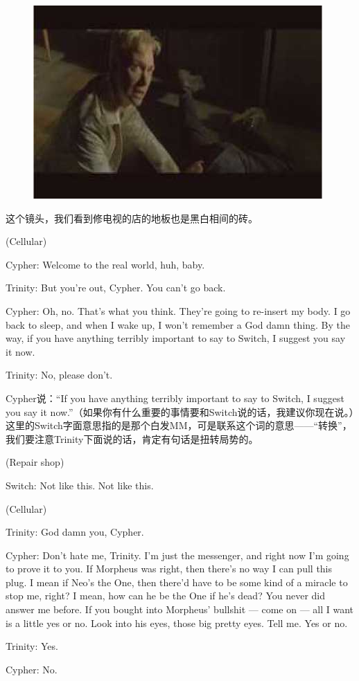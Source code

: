 \documentclass{ctexart}
\newenvironment{myquote}{\color{green} \setlength{\leftskip}{6em} \setlength{\rightskip}{4em} \setlength{\parindent}{-2em}}{\par}
\begin{document}
\begin{figure}[htb]
\centering
\includegraphics[width=0.5\linewidth]{fig/read_Matrix-59}
\end{figure}

这个镜头，我们看到修电视的店的地板也是黑白相间的砖。

\begin{myquote}
(Cellular)

Cypher: Welcome to the real world, huh, baby.

Trinity: But you're out, Cypher. You can't go back.

Cypher: Oh, no. That's what you think. They're going to re-insert my body. I go back to sleep, and when I wake up, I won't remember a God damn thing. By the way, if you have anything terribly important to say to Switch, I suggest you say it now.

Trinity: No, please don't.
\end{myquote}

Cypher说：“If you have anything terribly important to say to Switch, I suggest you say it now.”（如果你有什么重要的事情要和Switch说的话，我建议你现在说。）这里的Switch字面意思指的是那个白发MM，可是联系这个词的意思——“转换”，我们要注意Trinity下面说的话，肯定有句话是扭转局势的。

\begin{myquote}
(Repair shop)

Switch: Not like this. Not like this.

(Cellular)

Trinity: God damn you, Cypher.

Cypher: Don't hate me, Trinity. I'm just the messenger, and right now I'm going to prove it to you. If Morpheus was right, then there's no way I can pull this plug. I mean if Neo's the One, then there'd have to be some kind of a miracle to stop me, right? I mean, how can he be the One if he's dead? You never did answer me before. If you bought into Morpheus' bullshit --- come on --- all I want is a little yes or no. Look into his eyes, those big pretty eyes. Tell me. Yes or no.

Trinity: Yes.

Cypher: No.
\end{myquote}
\end{document}
